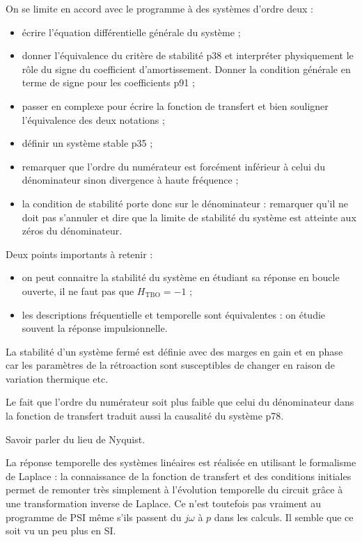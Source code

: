 On se limite en accord avec le programme à des systèmes d'ordre deux :
\begin{itemize}
\item écrire l'équation différentielle générale du système ;
\item donner l'équivalence du critère de stabilité \cite{Cardini2017} p38 et interpréter physiquement le rôle du signe du coefficient d'amortissement.
Donner la condition générale en terme de signe pour les coefficients \cite{Neveu2019a} p91 ;
\item passer en complexe pour écrire la fonction de transfert et bien souligner l'équivalence des deux notations ;
\item définir un système stable \cite{Cardini2017} p35 ;
\item remarquer que l'ordre du numérateur est forcément inférieur à celui du dénominateur sinon divergence à haute fréquence ;
\item la condition de stabilité porte donc sur le dénominateur : remarquer qu'il ne doit pas s'annuler et dire que la limite de stabilité du système est atteinte aux zéros du dénominateur.
\end{itemize}
Deux points importants à retenir :
\begin{itemize}
\item on peut connaitre la stabilité du système en étudiant sa réponse en boucle ouverte, il ne faut pas que $H_\mathrm{TBO}=-1$ ;
\item les descriptions fréquentielle et temporelle sont équivalentes : on étudie souvent la réponse impulsionnelle.
\end{itemize}

\begin{remarque}
La stabilité d'un système fermé est définie avec des marges en gain et en phase car les paramètres de la rétroaction sont susceptibles de changer en raison de variation thermique etc.

\noindent
Le fait que l'ordre du numérateur soit plus faible que celui du dénominateur dans la fonction de transfert traduit aussi la causalité du système \cite{Neveu2019a} p78.

\noindent
Savoir parler du lieu de Nyquist.

\noindent
La réponse temporelle des systèmes linéaires est réalisée en utilisant le formalisme de Laplace : la connaissance de la fonction de transfert et des conditions initiales permet de remonter très simplement à l'évolution temporelle du circuit grâce à une transformation inverse de Laplace.
Ce n'est toutefois pas vraiment au programme de PSI même s'ils passent du $j\omega$ à $p$ dans les calculs.
Il semble que ce soit vu un peu plus en SI.
\end{remarque}

